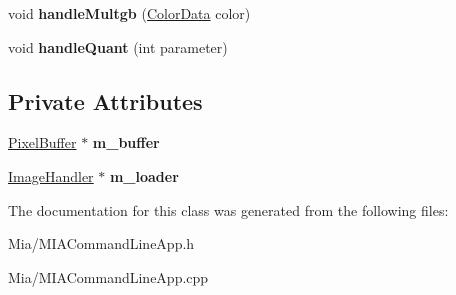 \begin{DoxyCompactItemize}
\item 
\hypertarget{classMIACommandLineApp_ab3837792e96c27534b0290e7b7bdd5cc}{void {\bfseries handle\-Multgb} (\hyperlink{classColorData}{Color\-Data} color)}\label{classMIACommandLineApp_ab3837792e96c27534b0290e7b7bdd5cc}

\item 
\hypertarget{classMIACommandLineApp_a7dd611671ab000d8c7975d4b9b2f125b}{void {\bfseries handle\-Quant} (int parameter)}\label{classMIACommandLineApp_a7dd611671ab000d8c7975d4b9b2f125b}

\end{DoxyCompactItemize}
\subsection*{Private Attributes}
\begin{DoxyCompactItemize}
\item 
\hypertarget{classMIACommandLineApp_ab0b3fcdb2414478c081d4713f99863c5}{\hyperlink{classPixelBuffer}{Pixel\-Buffer} $\ast$ {\bfseries m\-\_\-buffer}}\label{classMIACommandLineApp_ab0b3fcdb2414478c081d4713f99863c5}

\item 
\hypertarget{classMIACommandLineApp_a193cb889437a249d9517fea6c4ba8140}{\hyperlink{classImageHandler}{Image\-Handler} $\ast$ {\bfseries m\-\_\-loader}}\label{classMIACommandLineApp_a193cb889437a249d9517fea6c4ba8140}

\end{DoxyCompactItemize}


The documentation for this class was generated from the following files\-:\begin{DoxyCompactItemize}
\item 
Mia/M\-I\-A\-Command\-Line\-App.\-h\item 
Mia/M\-I\-A\-Command\-Line\-App.\-cpp\end{DoxyCompactItemize}
